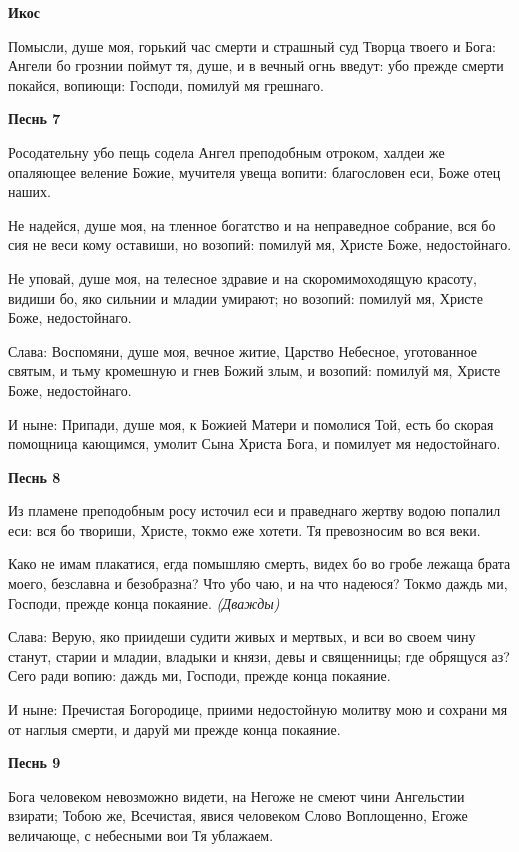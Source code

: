 \medskip
\bfseries Икос\normalfont{}\nopagebreak


Помысли, душе моя, горький час смерти и страшный суд Творца твоего и Бога: Ангели бо грознии поймут тя, душе, и в вечный огнь введут: убо прежде смерти покайся, вопиющи: Господи, помилуй мя грешнаго.


\medskip
\bfseries Песнь 7\normalfont{}\nopagebreak


Росодательну убо пещь содела Ангел преподобным отроком, халдеи же опаляющее веление Божие, мучителя увеща вопити: благословен еси, Боже отец наших.


Не надейся, душе моя, на тленное богатство и на неправедное собрание, вся бо сия не веси кому оставиши, но возопий: помилуй мя, Христе Боже, недостойнаго.


Не уповай, душе моя, на телесное здравие и на скоромимоходящую красоту, видиши бо, яко сильнии и младии умирают; но возопий: помилуй мя, Христе Боже, недостойнаго.


Слава: Воспомяни, душе моя, вечное житие, Царство Небесное, уготованное святым, и тьму кромешную и гнев Божий злым, и возопий: помилуй мя, Христе Боже, недостойнаго.


И ныне: Припади, душе моя, к Божией Матери и помолися Той, есть бо скорая помощница кающимся, умолит Сына Христа Бога, и помилует мя недостойнаго.


\medskip
\bfseries Песнь 8\normalfont{}\nopagebreak


Из пламене преподобным росу источил еси и праведнаго жертву водою попалил еси: вся бо твориши, Христе, токмо еже хотети. Тя превозносим во вся веки.


Како не имам плакатися, егда помышляю смерть, видех бо во гробе лежаща брата моего, безславна и безобразна? Что убо чаю, и на что надеюся? Токмо даждь ми, Господи, прежде конца покаяние. \itshape (Дважды)\normalfont{}


Слава: Верую, яко приидеши судити живых и мертвых, и вси во своем чину станут, старии и младии, владыки и князи, девы и священницы; где обрящуся аз? Сего ради вопию: даждь ми, Господи, прежде конца покаяние.


И ныне: Пречистая Богородице, приими недостойную молитву мою и сохрани мя от наглыя смерти, и даруй ми прежде конца покаяние.


\medskip
\bfseries Песнь 9\normalfont{}\nopagebreak


Бога человеком невозможно видети, на Негоже не смеют чини Ангельстии взирати; Тобою же, Всечистая, явися человеком Слово Воплощенно, Егоже величающе, с небесными вои Тя ублажаем.


